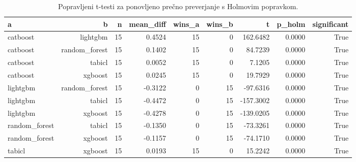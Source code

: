 \begin{table}[htbp]
\centering
\caption{Popravljeni t-testi za ponovljeno prečno preverjanje s Holmovim popravkom.}
\label{tab:corrected-ttest}
\begin{tabular}{lrrrrrrrr}
\hline
a & b & n & mean\_diff & wins\_a & wins\_b & t & p\_holm & significant \\
\hline
catboost & lightgbm & 15 & 0.4524 & 15 & 0 & 162.6482 & 0.0000 & True \\
catboost & random\_forest & 15 & 0.1402 & 15 & 0 & 84.7239 & 0.0000 & True \\
catboost & tabicl & 15 & 0.0052 & 15 & 0 & 7.1205 & 0.0000 & True \\
catboost & xgboost & 15 & 0.0245 & 15 & 0 & 19.7929 & 0.0000 & True \\
lightgbm & random\_forest & 15 & -0.3122 & 0 & 15 & -97.6316 & 0.0000 & True \\
lightgbm & tabicl & 15 & -0.4472 & 0 & 15 & -157.3002 & 0.0000 & True \\
lightgbm & xgboost & 15 & -0.4278 & 0 & 15 & -139.0205 & 0.0000 & True \\
random\_forest & tabicl & 15 & -0.1350 & 0 & 15 & -73.3261 & 0.0000 & True \\
random\_forest & xgboost & 15 & -0.1157 & 0 & 15 & -74.1710 & 0.0000 & True \\
tabicl & xgboost & 15 & 0.0193 & 15 & 0 & 15.2242 & 0.0000 & True \\
\hline
\end{tabular}
\end{table}
